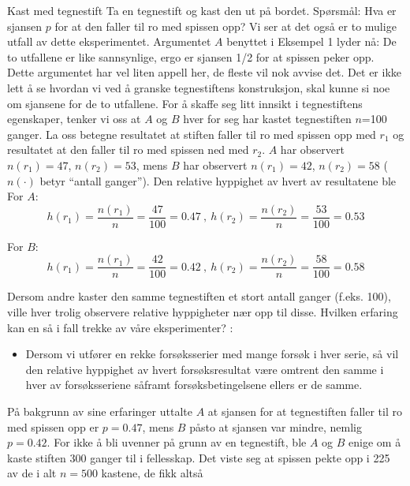 \begin{eksempel}{Kast med tegnestift}
Ta en tegnestift og kast den ut på bordet.  Spørsmål:  Hva er
sjansen $p$ for at den faller til ro med spissen opp?  Vi ser at
det også er to mulige utfall av dette eksperimentet.  Argumentet
$A$ benyttet i Eksempel 1 lyder nå:  De to utfallene er like
sannsynlige, ergo er sjansen 1/2 for at spissen peker opp.  Dette
argumentet har vel liten appell her, de fleste vil nok avvise
det.  Det er ikke lett å se hvordan vi ved å granske tegnestiftens
 konstruksjon, skal kunne si noe om sjansene for de to
utfallene.  For å skaffe seg litt innsikt i tegnestiftens
egenskaper, tenker vi oss at $A$ og $B$ hver for seg har kastet
tegnestiften $n$=100 ganger.  La oss betegne resultatet at stiften
faller til ro med spissen opp med $r_{1}$ og resultatet at den faller
til ro med spissen ned med $r_{2}$.  $A$ har observert $n(r_{1})=47$,
$n(r_{2})=53$, mens $B$ har observert $n(r_{1})=42$, $n(r_{2})=58$ ($n(\cdot )$
 betyr ``antall ganger'').  Den relative hyppighet av hvert av resultatene ble \\

For $A$:
\[h(r_{1}) = \frac{n(r_{1})}{n} = \frac{47}{100} = 0.47  \ , \
 h(r_{2}) = \frac{n(r_{2})}{n} = \frac{53}{100} = 0.53 \] 

For $B$:                        
\[h(r_{1}) = \frac{n(r_{1})}{n} = \frac{42}{100} = 0.42 \ , \
 h(r_{2}) = \frac{n(r_{2})}{n} = \frac{58}{100} = 0.58 \] 

\noindent
Dersom andre kaster den samme tegnestiften et stort antall ganger
(f.eks. 100), ville hver trolig observere relative hyppigheter nær
opp til disse.  Hvilken erfaring kan en så i fall trekke av våre
eksperimenter? :
\begin{itemize}
 \item
  Dersom vi utfører en rekke forsøksserier med mange forsøk i
     hver serie, så vil den relative hyppighet av hvert
     forsøksresultat være omtrent den samme i hver av
   forsøksseriene såframt forsøksbetingelsene ellers er de samme.
\end{itemize}

\noindent På bakgrunn av sine erfaringer uttalte $A$ at sjansen for at
tegnestiften faller til ro med spissen opp er $p=0.47$, mens $B$
påsto at sjansen var mindre, nemlig $p=0.42$.  For ikke å bli
uvenner på grunn av en tegnestift, ble $A$ og $B$ enige om å kaste
stiften 300 ganger til i fellesskap.  Det viste seg at spissen
pekte opp i 225 av de i alt $n=500$ kastene, de fikk altså


\end{eksempel}
